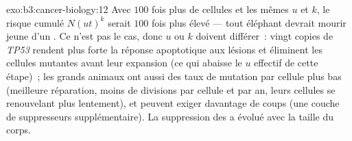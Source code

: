 \begin{solution}{exo:b3:cancer-biology:12}
Avec $100$ fois plus de cellules et les mêmes $u$ et $k$, le risque
cumulé $N(ut)^{k}$ serait $100$ fois plus élevé --- tout éléphant
devrait mourir jeune d'un . Ce n'est pas le cas, donc $u$ ou $k$
doivent différer~: vingt copies de \emph{TP53} rendent plus forte la
réponse apoptotique aux lésions et éliminent les cellules mutantes
avant leur expansion (ce qui abaisse le $u$ effectif de cette étape)~;
les grands animaux ont aussi des taux de mutation par cellule plus bas
(meilleure réparation, moins de divisions par cellule et par an, leurs
cellules se renouvelant plus lentement), et peuvent exiger davantage de
coups (une couche de suppresseurs supplémentaire). La suppression des
 a évolué avec la taille du corps.
\end{solution}

